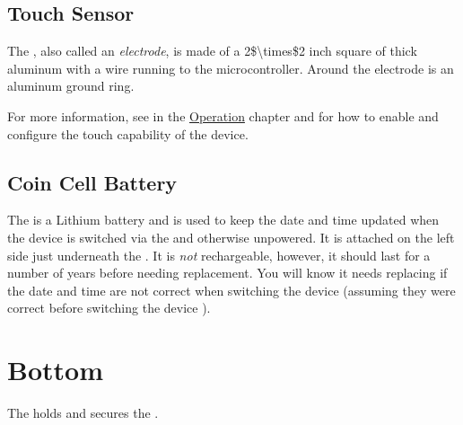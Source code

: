 \section{Touch Sensor} \label{Touch Sensor}

The , also called an \textit{electrode}, is made of a \num{2$\times$2}
inch square of  thick aluminum with a wire running to the
microcontroller.  Around the electrode is an aluminum ground ring.

\par\medskip

For more information, see \hyperref[Operation - Touch Sensor]{} in the
\hyperref[Operation]{Operation} chapter and \hyperref[Touch Settings]{}
for how to enable and configure the touch capability of the device.

\section{Coin Cell Battery} \label{Coin Cell Battery}

The  is a   Lithium battery and is used
to keep the date and time updated when the device is switched  via the
\hyperref[Power Switch]{} and otherwise unpowered.  It is attached on the
left side just underneath the .  It is \textit{not} rechargeable,
however, it should last for a number of years before needing replacement.  You
will know it needs replacing if the date and time are not correct when switching
the device  (assuming they were correct before switching the device
).

\chapter{Bottom} \label{Bottom}

The  holds and secures the .

